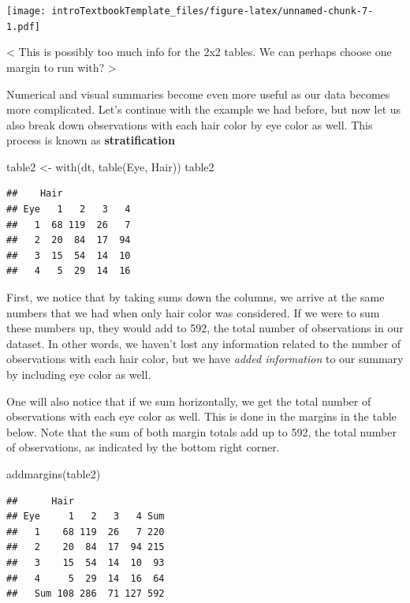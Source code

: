 \documentclass[
]{book}
\newenvironment{Shaded}{\begin{snugshade}}{\end{snugshade}}
\newcommand{\FunctionTok}[1]{\textcolor[rgb]{0.00,0.00,0.00}{#1}}
\newcommand{\NormalTok}[1]{#1}
\newcommand{\OtherTok}[1]{\textcolor[rgb]{0.56,0.35,0.01}{#1}}
\theoremstyle{definition}
\theoremstyle{definition}
\theoremstyle{definition}
\theoremstyle{remark}
\begin{document}
\texttt{[image: introTextbookTemplate\_files/figure-latex/unnamed-chunk-7-1.pdf]}

\textless{} This is possibly too much info for the 2x2 tables. We can perhaps choose one margin to run with? \textgreater{}

Numerical and visual summaries become even more useful as our data becomes more complicated. Let's continue with the example we had before, but now let us also break down observations with each hair color by eye color as well. This process is known as \textbf{stratification}

\begin{Shaded}
\begin{Highlighting}[]
\NormalTok{table2 }\OtherTok{\textless{}{-}} \FunctionTok{with}\NormalTok{(dt, }\FunctionTok{table}\NormalTok{(Eye, Hair))}
\NormalTok{table2}
\end{Highlighting}
\end{Shaded}

\begin{verbatim}
##    Hair
## Eye   1   2   3   4
##   1  68 119  26   7
##   2  20  84  17  94
##   3  15  54  14  10
##   4   5  29  14  16
\end{verbatim}

First, we notice that by taking sums down the columns, we arrive at the same numbers that we had when only hair color was considered. If we were to sum these numbers up, they would add to 592, the total number of observations in our dataset. In other words, we haven't lost any information related to the number of observations with each hair color, but we have \emph{added information} to our summary by including eye color as well.

One will also notice that if we sum horizontally, we get the total number of observations with each eye color as well. This is done in the margins in the table below. Note that the sum of both margin totals add up to 592, the total number of observations, as indicated by the bottom right corner.

\begin{Shaded}
\begin{Highlighting}[]
\FunctionTok{addmargins}\NormalTok{(table2)}
\end{Highlighting}
\end{Shaded}

\begin{verbatim}
##      Hair
## Eye     1   2   3   4 Sum
##   1    68 119  26   7 220
##   2    20  84  17  94 215
##   3    15  54  14  10  93
##   4     5  29  14  16  64
##   Sum 108 286  71 127 592
\end{verbatim}
\end{document}
